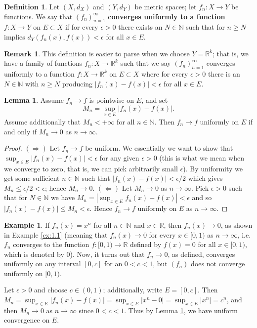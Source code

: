 \documentclass[oneside]{amsart}
\theoremstyle{definition}
\newtheorem{defi}{Definition}[section]
\newtheorem{lemma}{Lemma}[section]
\newtheorem{rem}{Remark}[section]
\newtheorem{ex}{Example}[section]
\newcommand{\rr}{\mathbb R}
\newcommand{\nn}{\mathbb N}
\begin{document}
\begin{defi} Let $(X,d_X)$ and $(Y, d_Y)$ be metric spaces; let $f_n\colon X \to Y$ be functions. We say that $(f_n)_{n=1}^\infty$ \textbf{converges uniformly to a function $f \colon X \to Y$} on $E \subset X$ if for every $\epsilon > 0$ there exists an $N \in \nn$ such that for $ n \geq N$ implies $d_Y(f_n(x), f(x)) < \epsilon$ for all $x \in E$. 
\end{defi}
\begin{rem}
This definition is easier to parse when we choose  $Y =\rr^k$; that is, we have a family of functions $f_n \colon X \to \rr^k$ such that we say $(f_n)_{n=1}^\infty$ converges uniformly to a function $f \colon X \to \rr^k$ on $E \subset X$ where for every $\epsilon > 0$ there is an $N\in \nn$ with $n \geq N$ producing $|f_n(x) - f(x)| < \epsilon$ for all $x \in E$.
\end{rem}

\begin{lemma} \label{lem:1.1}
	Assume $f_n \to f$ is pointwise on $E$, and set $$ M_n = \sup_{x \in E} |f_n(x) - f(x)|.$$ Assume additionally that $ M_n < + \infty$ for all $ n \in \nn$. Then $f_n \to f$ uniformly on $E$ if and only if $M_n \to 0$ as $n \to \infty$. 
\end{lemma}
\begin{proof} $(\Rightarrow)$ Let $f_n \to f$ be uniform. We essentially we want to show that $\sup_{x \in E} |f_n(x) - f(x)| < \epsilon$ for any given $\epsilon > 0$ (this is what we mean when we converge to zero, that is, we can pick arbitrarily small $\epsilon$). By uniformity we get some sufficient $n \in \nn$ such that $|f_n(x) - f(x)|<\epsilon/2$ which gives $M_n \leq \epsilon/2<\epsilon$; hence $M_n \to 0$. $(\Leftarrow)$ Let $M_n \to 0$ as $n \to \infty$. Pick $\epsilon >0$ such that for $N \in \nn$ we have $M_n = |\sup_{x \in E} f_n(x) - f(x)| < \epsilon$ and so $|f_n(x) - f(x)| \leq M_n <\epsilon$. Hence $f_n \to f$ uniformly on $E$ as $n \to \infty$. 
\end{proof}
\begin{ex}
If $f_n(x) = x^n$ for all $n \in \nn$ and $x \in \rr$, then $f_n(x) \to 0$, as shown in Example \ref{ex:1.1} (meaning that $f_n(x) \to 0$ for every $x \in [0,1)$ as $ n \to \infty$, i.e. $f_n$ converges to the function $f \colon [0,1) \to \rr$ defined by $f(x) = 0$ for all $x \in [0,1)$, which is denoted by $0$). Now, it turns out that $f_n \to 0$, as defined, converges uniformly on any interval $[0,c]$ for an $0 < c <1$, but $(f_n)$ does not converge uniformly on $[0,1)$.

Let $\epsilon > 0$ and choose $c \in (0,1)$; additionally, write $E = [0,c]$. Then $M_n =\sup_{x \in E} |f_n(x) - f(x)| = \sup_{x \in E} |x^n-0| = \sup_{x \in E} |x^n| =c^n$, and then $M_n \to 0$ as $n \to \infty$ since $0<c<1$. Thus by Lemma \ref{lem:1.1}, we have uniform convergence on $E$. 
\end{ex}
\end{document}
